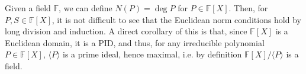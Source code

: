 \documentclass[]{article}
\theoremstyle{definition}
\theoremstyle{definition}
\begin{document}
Given a field \(\mathbb{F}\), we can define \(N(P) = \deg P\) for 
\(P \in \mathbb{F}[X]\). Then, for \(P, S \in \mathbb{F}[X]\), it is not 
difficult to see that the Euclidean norm conditions hold by long division and 
induction. A direct corollary of this is that, since \(\mathbb{F}[X]\) is 
a Euclidean domain, it is a PID, and thus, for any irreducible polynomial 
\(P \in \mathbb{F}[X]\), \(\langle P \rangle\) is a prime ideal, hence maximal, 
i.e. by definition \(\mathbb{F}[X] / \langle P \rangle\) is a field.
\end{document}
